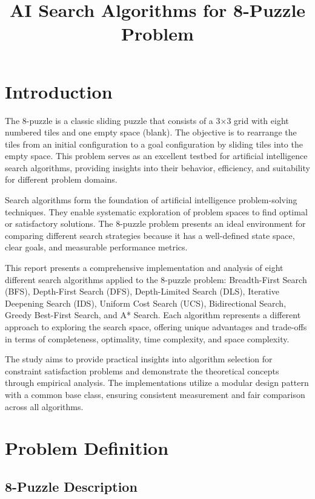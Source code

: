 \documentclass[11pt,a4paper]{article}
\title{AI Search Algorithms for 8-Puzzle Problem}
\date{}
\begin{document}
\maketitle

\section{Introduction}

The 8-puzzle is a classic sliding puzzle that consists of a 3×3 grid with eight numbered tiles and one empty space (blank). The objective is to rearrange the tiles from an initial configuration to a goal configuration by sliding tiles into the empty space. This problem serves as an excellent testbed for artificial intelligence search algorithms, providing insights into their behavior, efficiency, and suitability for different problem domains.

Search algorithms form the foundation of artificial intelligence problem-solving techniques. They enable systematic exploration of problem spaces to find optimal or satisfactory solutions. The 8-puzzle problem presents an ideal environment for comparing different search strategies because it has a well-defined state space, clear goals, and measurable performance metrics.

This report presents a comprehensive implementation and analysis of eight different search algorithms applied to the 8-puzzle problem: Breadth-First Search (BFS), Depth-First Search (DFS), Depth-Limited Search (DLS), Iterative Deepening Search (IDS), Uniform Cost Search (UCS), Bidirectional Search, Greedy Best-First Search, and A* Search. Each algorithm represents a different approach to exploring the search space, offering unique advantages and trade-offs in terms of completeness, optimality, time complexity, and space complexity.

The study aims to provide practical insights into algorithm selection for constraint satisfaction problems and demonstrate the theoretical concepts through empirical analysis. The implementations utilize a modular design pattern with a common base class, ensuring consistent measurement and fair comparison across all algorithms.

\section{Problem Definition}

\subsection{8-Puzzle Description}
\end{document}
